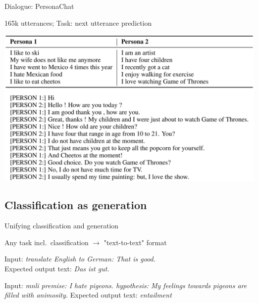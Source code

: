 \documentclass[12pt,aspectratio=169,handout]{beamer}
\begin{document}
\begin{frame}{Dialogue: PersonaChat}
	
165k utterances; Task: next utterance prediction
	
\includegraphics[width=\linewidth]{img/dial1.png}


\end{frame}



\subsection{Classification as generation}

\begin{frame}{Unifying classification and generation}

Any task incl.\ classification $\to$ "text-to-text" format

\begin{example}[Translation En-De]
Input: \emph{translate English to German: That is good.} \\
Expected output text: \emph{Das ist gut.}
\end{example}

\begin{example}[MNLI]
Input: \emph{mnli premise: I hate pigeons. hypothesis: My feelings towards pigeons are filled with animosity.}
Expected output text: \emph{entailment}
\end{example}


\end{frame}
\end{document}
